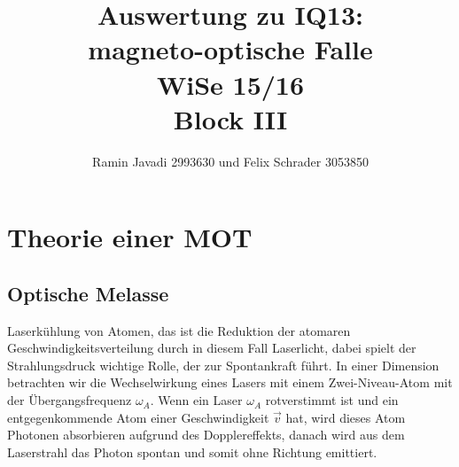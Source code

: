 \documentclass[12pt,a4paper]{article}
\title{Auswertung zu IQ13:\\
       magneto-optische Falle\\
       WiSe 15/16\\
       Block III}
\author{Ramin Javadi 2993630 und Felix Schrader 3053850}
\date{}
\begin{document}
\maketitle
\tableofcontents
\pagebreak
\section{Theorie einer MOT}
  \subsection{Optische Melasse}
  
  Laserkühlung von Atomen, das ist die Reduktion der atomaren Geschwindigkeitsverteilung durch in diesem Fall Laserlicht, dabei spielt der Strahlungsdruck wichtige Rolle, der zur Spontankraft führt. In einer Dimension betrachten wir die Wechselwirkung eines Lasers mit einem Zwei-Niveau-Atom mit der Übergangsfrequenz ${\omega_A}$. Wenn ein Laser ${\omega_A}$ rotverstimmt ist und ein entgegenkommende Atom einer Geschwindigkeit ${\vec v}$ hat, wird dieses Atom Photonen absorbieren aufgrund des Dopplereffekts, danach wird aus dem Laserstrahl das Photon spontan und somit ohne Richtung emittiert.
  
\end{document}
